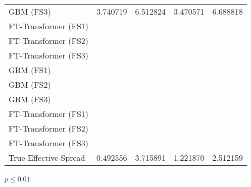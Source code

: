\begin{threeparttable}
\begin{tabular}{lSSSS}
        \gls{GBM} (FS3)       & 3.740719                                                & 6.512824 \tnote{\dag}                                       & 3.470571      & 6.688818 \tnote{\dag}   \\
        FT-Transformer (FS1)  &                                                         & \tnote{\dag}                                                &               & \tnote{\dag}            \\
        FT-Transformer (FS2)  &                                                         & \tnote{\dag}                                                &               & \tnote{\dag}            \\
        FT-Transformer (FS3)  &                                                         & \tnote{\dag}                                                &               & \tnote{\dag}            \\ \midrule
        \gls{GBM} (FS1)       &                                                         & \tnote{\dag}                                                &               & \tnote{\dag}            \\
        \gls{GBM} (FS2)       &                                                         & \tnote{\dag}                                                &               & \tnote{\dag}            \\
        \gls{GBM} (FS3)       &                                                         & \tnote{\dag}                                                &               & \tnote{\dag}            \\
        FT-Transformer (FS1)  &                                                         & \tnote{\dag}                                                &               & \tnote{\dag}            \\
        FT-Transformer (FS2)  &                                                         & \tnote{\dag}                                                &               & \tnote{\dag}            \\
        FT-Transformer (FS3)  &                                                         & \tnote{\dag}                                                &               & \tnote{\dag}            \\ \midrule
        True Effective Spread & 0.492556                                                & 3.715891                                                 & 1.221870      & 2.512159             \\ \bottomrule
    \end{tabular}
    \begin{tablenotes}\footnotesize
        \item[\dag] $p \leq 0.01$.
    \end{tablenotes}
\end{threeparttable}
